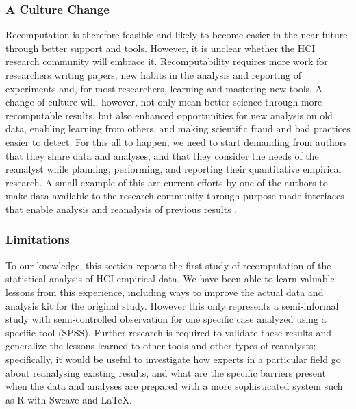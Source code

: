 \subsubsection{A Culture Change}
Recomputation is therefore feasible and likely to become easier in the near future through better support and tools. However, it is unclear whether the HCI research community will embrace it. Recomputability requires more work for researchers writing papers, new habits in the analysis and reporting of experiments and, for most researchers, learning and mastering new tools. A change of culture will, however, not only mean better science through more recomputable results, but also enhanced opportunities for new analysis on old data, enabling learning from others, and making scientific fraud and bad practices easier to detect. For this all to happen, we need to start demanding from authors that they share data and analyses, and that they consider the needs of the reanalyst while planning, performing, and reporting their quantitative empirical research. A small example of this are current efforts by one of the authors to make data available to the research community through purpose-made interfaces that enable analysis and reanalysis of previous results \cite{Grijincu:2014}. 

\subsubsection{Limitations}
To our knowledge, this section reports the first study of recomputation of the statistical analysis of HCI empirical data. We have been able to learn valuable lessons from this experience, including ways to improve the actual data and analysis kit for the original study. However this only represents a semi-informal study with semi-controlled observation for one specific case analyzed using a specific tool (SPSS). Further research is required to validate these results and generalize the lessons learned to other tools and other types of reanalysts; specifically, it would be useful to investigate how experts in a particular field go about reanalysing existing results, and what are the specific barriers present when the data and analyses are prepared with a more sophisticated system such as R with Sweave and LaTeX.

